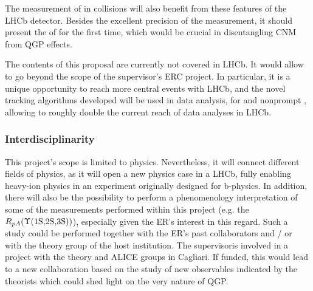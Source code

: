\documentclass[a4paper,11pt]{article}
\newcommand{\ER}{ER}
\newcommand{\supervisor}{the supervisor}
\newcommand{\Supervisor}{The supervisor}
\begin{document}
The measurement of \PgUabc in \ppb collisions will also benefit from these features of the LHCb detector. Besides the excellent precision of the measurement, it should present the \rpa of \PgUc for the first time, which would be crucial in disentangling CNM from QGP effects.

The contents of this proposal are currently not covered in LHCb. It would allow to go beyond the scope of \supervisor's ERC project. In particular, it is a unique opportunity to reach more central \pbpb events with LHCb, and the novel tracking algorithms developed will be used in data analysis, for \Dz and nonprompt \Jpsi, allowing to roughly double the current \npart reach of data analyses in LHCb. 
% 
% 

% 

\subsubsection{Interdisciplinarity}

This project's scope is limited to physics. Nevertheless, it will connect different fields of physics, as it will open a new physics case in a LHCb, fully enabling heavy-ion physics in an experiment originally designed for b-physics.
In addition, there will also be the possibility to perform a phenomenology interpretation of some of the measurements performed within this project (e.g. the $R_{pA}(\Upsilon\text{(1S,2S,3S)})$), especially given the \ER's interest in this regard. Such a study could be performed together with the \ER's past collaborators and / or with the theory group of the host institution. \Supervisor is involved in a project with the theory and ALICE  groups in Cagliari. If funded, this would lead to a new collaboration based on the study of new observables indicated by the theorists which could shed light on the very nature of QGP.
\end{document}
